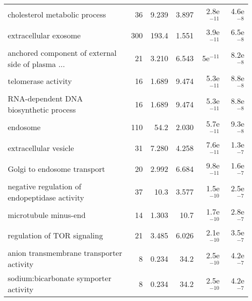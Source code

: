 \begin{longtable}{lrrrrr}
                     cholesterol metabolic process &                      36 &                   9.239 &      3.897 &         2.8e$^{-11}$ &          4.6e$^{-8}$ \\
                             extracellular exosome &                     300 &                   193.4 &      1.551 &         3.9e$^{-11}$ &          6.5e$^{-8}$ \\
 anchored component of external side of plasma ... &                      21 &                   3.210 &      6.543 &           5e$^{-11}$ &          8.2e$^{-8}$ \\
                               telomerase activity &                      16 &                   1.689 &      9.474 &         5.3e$^{-11}$ &          8.8e$^{-8}$ \\
            RNA-dependent DNA biosynthetic process &                      16 &                   1.689 &      9.474 &         5.3e$^{-11}$ &          8.8e$^{-8}$ \\
                                          endosome &                     110 &                    54.2 &      2.030 &         5.7e$^{-11}$ &          9.3e$^{-8}$ \\
                             extracellular vesicle &                      31 &                   7.280 &      4.258 &         7.6e$^{-11}$ &          1.3e$^{-7}$ \\
                       Golgi to endosome transport &                      20 &                   2.992 &      6.684 &         9.8e$^{-11}$ &          1.6e$^{-7}$ \\
     negative regulation of endopeptidase activity &                      37 &                    10.3 &      3.577 &         1.5e$^{-10}$ &          2.5e$^{-7}$ \\
                             microtubule minus-end &                      14 &                   1.303 &       10.7 &         1.7e$^{-10}$ &          2.8e$^{-7}$ \\
                       regulation of TOR signaling &                      21 &                   3.485 &      6.026 &         2.1e$^{-10}$ &          3.5e$^{-7}$ \\
          anion transmembrane transporter activity &                       8 &                   0.234 &       34.2 &         2.5e$^{-10}$ &          4.2e$^{-7}$ \\
             sodium:bicarbonate symporter activity &                       8 &                   0.234 &       34.2 &         2.5e$^{-10}$ &          4.2e$^{-7}$ \\

\end{longtable}
